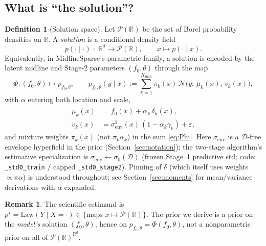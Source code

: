 \documentclass[11pt,a4paper]{article}
\theoremstyle{plain}
\theoremstyle{definition}
\newtheorem{definition}[theorem]{Definition}
\newtheorem{remark}[theorem]{Remark}
\theoremstyle{remark}
\newcommand{\R}{\mathbb{R}}
\newcommand{\Ncal}{\mathcal{N}}
\newcommand{\D}{\mathcal{D}}
\newcommand{\tht}{\theta}
\newcommand{\Kmax}{K_{\max}}
\newcommand{\law}{\mathrm{Law}}
\begin{document}
\subsection{What is ``the solution''?}
\begin{definition}[Solution space]
Let \(\mathcal{P}(\R)\) be the set of Borel probability densities on \(\R\).
A \emph{solution} is a conditional density field
\[
  p(\cdot\mid\cdot)
  \;:\;
  \R^d
  \to
  \mathcal{P}(\R),
  \qquad
  x
  \mapsto
  p(\cdot\mid x).
\]
Equivalently, in MidlineSparse's parametric family, a solution is encoded by the
latent midline and Stage-2 parameters \((f_0,\tht)\) through the map
\begin{equation}
  \Phi
  :
  (f_0,\tht)
  \mapsto
  p_{f_0,\tht},
  \qquad
  p_{f_0,\tht}(y\mid x)
  :=
  \sum_{k=1}^{\Kmax}
  \pi_k(x)\,
  \Ncal\!\bigl(y;\,\mu_k(x),\,v_k(x)\bigr),
  \label{eq:Phi}
\end{equation}
with \(\alpha\) entering both location and scale,
\begin{align}
  \mu_k(x)
  &=
  f_0(x)+\alpha_k\,\tilde\delta_k(x),
  \label{eq:mu-hier}
  \\
  v_k(x)
  &=
  \sigma_{\mathrm{env}}^2(x)\,(1-\alpha_k\gamma_k)+\varepsilon,
  \label{eq:v-hier}
\end{align}
and mixture weights \(\pi_k(x)\) (not \(\pi_k\alpha_k\)) in the sum
\eqref{eq:Phi}.
Here \(\sigma_{\mathrm{env}}\) is a \(\D\)-free envelope hyperfield in the prior
(Section~\ref{sec:notation}); the two-stage algorithm's estimative specialization
is \(\sigma_{\mathrm{env}}\leftarrow\sigma_0(\D)\) (frozen Stage~1 predictive std;
code: \texttt{\_std0\_train} / capped \texttt{\_std0\_stage2}).
Pinning of \(\tilde\delta\) (which itself uses weights \(\propto\pi\alpha\)) is
understood throughout; see Section~\ref{sec:moments} for mean/variance
derivations with \(\alpha\) expanded.
\end{definition}

\begin{remark}
The scientific estimand is \(p^\star=\law(Y\mid X=\cdot)\in\{\text{maps }x\mapsto\mathcal{P}(\R)\}\).
The prior we derive is a prior on the \emph{model's} solution \((f_0,\tht)\), hence
on \(p_{f_0,\tht}=\Phi(f_0,\tht)\), not a nonparametric prior on all of
\(\mathcal{P}(\R)^{\R^d}\).
\end{remark}
\end{document}
